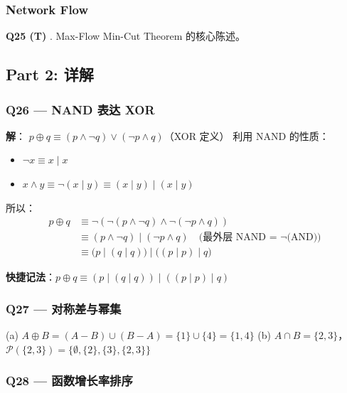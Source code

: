 \documentclass[10pt,a4paper,openany]{ctexbook}
\theoremstyle{definition}
\theoremstyle{remark}
\begin{document}
\subsubsection{Network Flow}

\textbf{Q25 (T)} . Max-Flow Min-Cut Theorem 的核心陈述。
\vspace{-2pt}

\subsection{Part 2: 详解}

\subsubsection{Q26 — NAND 表达 XOR}

\textbf{解}：
$p \oplus q \equiv (p \land \neg q) \lor (\neg p \land q)$（XOR 定义）
利用 NAND 的性质：
\begin{itemize}
\item $\neg x \equiv x \mid x$
\item $x \land y \equiv \neg(x \mid y) \equiv (x \mid y) \mid (x \mid y)$

\end{itemize}

所以：
\[
\begin{aligned}
p \oplus q &\equiv \neg(\neg(p \land \neg q) \land \neg(\neg p \land q)) \\
&\equiv (p \land \neg q) \mid (\neg p \land q) \quad\text{(最外层 NAND = $\neg$(AND))}\\
&\equiv \big(p \mid (q \mid q)\big) \mid \big((p \mid p) \mid q\big)
\end{aligned}
\]

\textbf{快捷记法}：$p \oplus q \equiv (p \mid (q \mid q)) \mid ((p \mid p) \mid q)$
\vspace{-2pt}

\subsubsection{Q27 — 对称差与幂集}

(a) $A \oplus B = (A - B) \cup (B - A) = \{1\} \cup \{4\} = \{1, 4\}$
(b) $A \cap B = \{2, 3\}$，$\mathcal{P}(\{2, 3\}) = \{\emptyset, \{2\}, \{3\}, \{2, 3\}\}$
\vspace{-2pt}

\subsubsection{Q28 — 函数增长率排序}
\end{document}
